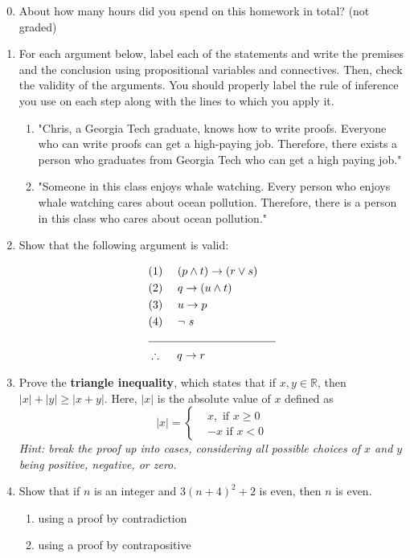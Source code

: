 \documentclass{article}
\begin{document}
\begin{enumerate}
    \setcounter{enumi}{-1}
    \item About how many hours did you spend on this homework in total? (not graded)
    
    \item For each argument below, label each of the statements and write the premises and the conclusion using propositional variables and connectives. Then, check the validity of the arguments. You should properly label the rule of inference you use on each step along with the lines to which you apply it. 
    \begin{enumerate}
        \item "Chris, a Georgia Tech graduate, knows how to write proofs. Everyone who can write proofs can get a high-paying job. Therefore, there exists a person who graduates from Georgia Tech who can get a high paying job." 
        \item "Someone in this class enjoys whale watching. Every person who enjoys whale watching cares about ocean pollution. Therefore, there is a person in this class who cares about ocean pollution."
    \end{enumerate}
    
    \item Show that the following argument is valid:
    
\begin{align*}
& (1) \quad ~(p \wedge t) \rightarrow (r \vee s)\\
& (2) \quad ~q \rightarrow (u\wedge t)\\
& (3) \quad ~u \rightarrow  p\\
& (4) \quad ~\neg ~ s\\
&\noindent\rule{4cm}{0.4pt}\\
& \therefore \quad ~ q\rightarrow r
\end{align*}    

    \item Prove the \textbf{triangle inequality}, which states that if $x, y \in \mathbb{R}$, then $|x| + |y| \geq |x + y|$. Here, $|x|$ is the absolute value of $x$ defined as
\[
|x|=\begin{cases}
& x, \mbox{ if $x\geq 0$}\\
& -x \mbox{ if $x< 0$}
\end{cases}
\]
\textit{Hint: break the proof up into cases, considering all possible choices of $x$ and $y$ being positive, negative, or zero.}
    
    \item Show that if $n$ is an integer and $3(n + 4)^2 + 2$ is even, then $n$ is even.
    \begin{enumerate}
        \item using a proof by contradiction
        \item using a proof by contrapositive
    \end{enumerate}


\end{enumerate}
\end{document}
